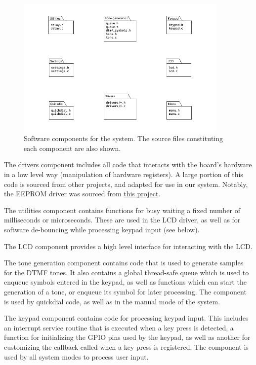 \documentclass[11pt,a4paper,twocolumn]{scrartcl}
\begin{document}
\begin{figure}
   \centering
   \includegraphics[width=0.92\textwidth]{software_components}
   \caption{Software components for the system. The source files constituting each component are also shown.}
   \label{fig:software_components}
\end{figure}

The drivers component includes all code that interacts with the board's hardware in a low level way (manipulation of hardware registers). A large portion of this code is sourced from other projects, and adapted for use in our system. Notably, the EEPROM driver was sourced from \href{https://github.com/RT-Thread/realboard-lpc4088/tree/master/software/lpcware_lpc408x/Drivers}{this project}.

The utilities component contains functions for busy waiting a fixed number of milliseconds or microseconds. These are used in the LCD driver, as well as for software de-bouncing while processing keypad input (see below).

The LCD component provides a high level interface for interacting with the LCD.

The tone generation component contains code that is used to generate samples for the DTMF tones. It also contains a global thread-safe queue which is used to enqueue symbols entered in the keypad, as well as functions which can start the generation of a tone, or enqueue its symbol for later processing. The component is used by quickdial code, as well as in the manual mode of the system.

The keypad component contains code for processing keypad input. This includes an interrupt service routine that is executed when a key press is detected, a function for initializing the GPIO pins used by the keypad, as well as another for customizing the callback called when a key press is registered. The component is used by all system modes to process user input.
\end{document}
